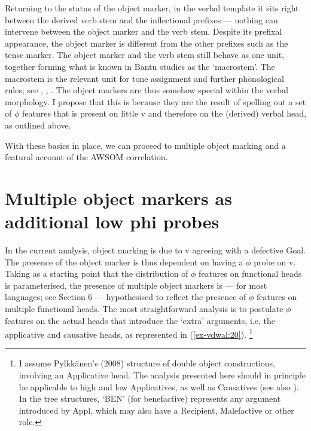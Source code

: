 \documentclass[output=paper
,modfonts
,nonflat]{langsci/langscibook}
\begin{document}
Returning to the status of the object marker, in the verbal template it sits right between the derived verb stem and the inflectional prefixes --- nothing can intervene between the object marker and the verb stem. Despite its prefixal appearance, the object marker is different from the other prefixes such as the tense marker. The object marker and the verb stem still behave as one unit, together forming what is known in Bantu studies as the ‘macrostem’. The macrostem is the relevant unit for tone assignment and further phonological rules; see \citet{Hyman2003}, \citet{Hyman_et_al2008}, \citet{Marlo2015}. The object markers are thus somehow special within the verbal morphology. I propose that this is because they are the result of spelling out a set of $\phi$ features that is present on little v and therefore on the (derived) verbal head, as outlined above.

With these basics in place, we can proceed to multiple object marking and a featural account of the AWSOM correlation.

\section{ Multiple object markers as additional low phi probes} \label{sec-vdwal:5}
In the current analysis, object marking is due to v agreeing with a defective Goal. The presence of the object marker is thus dependent on having a $\phi$ probe on v. Taking as a starting point that the distribution of $\phi$ features on functional heads is parameterised, the presence of multiple object markers is --- for most languages; see Section 6 --- hypothesised to reflect the presence of $\phi$ features on multiple functional heads. The most straightforward analysis is to postulate $\phi$ features on the actual heads that introduce the ‘extra’ arguments, i.e. the applicative and causative heads, as represented in (\ref{ex-vdwal:20}).{} \footnote{I assume Pylkkänen’s (2008) structure of double object constructions, involving an Applicative head. The analysis presented here should in principle be applicable to high and low Applicatives, as well as Causatives (see also \citealt{Van_der_Wal2017a, Van_der_Wal2017b}). In the tree structures, ‘BEN’ (for benefactive) represents any argument introduced by Appl, which may also have a Recipient, Malefactive or other role.}
\end{document}
